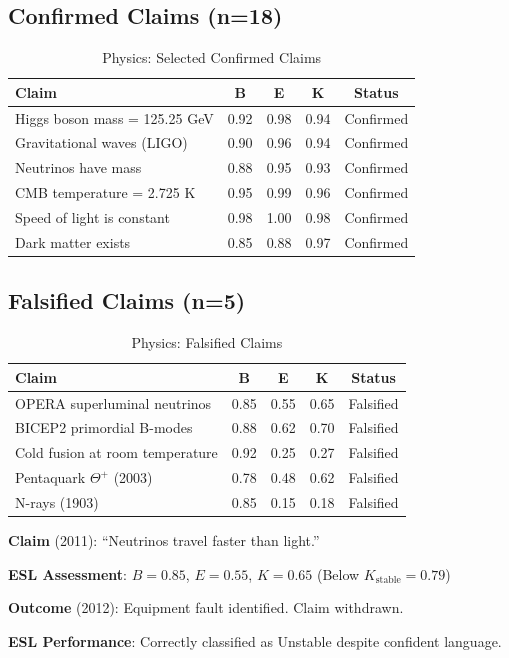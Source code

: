 \documentclass[11pt,a4paper]{article}
\theoremstyle{remark}
\begin{document}
\subsection{Confirmed Claims (n=18)}

\begin{table}[h]
\centering
\caption{Physics: Selected Confirmed Claims}
\begin{tabular}{p{5.5cm}cccc}
\toprule
\textbf{Claim} & \textbf{B} & \textbf{E} & \textbf{K} & \textbf{Status} \\
\midrule
Higgs boson mass = 125.25 GeV & 0.92 & 0.98 & 0.94 & Confirmed \\
Gravitational waves (LIGO) & 0.90 & 0.96 & 0.94 & Confirmed \\
Neutrinos have mass & 0.88 & 0.95 & 0.93 & Confirmed \\
CMB temperature = 2.725 K & 0.95 & 0.99 & 0.96 & Confirmed \\
Speed of light is constant & 0.98 & 1.00 & 0.98 & Confirmed \\
Dark matter exists & 0.85 & 0.88 & 0.97 & Confirmed \\
\bottomrule
\end{tabular}
\end{table}

\subsection{Falsified Claims (n=5)}

\begin{table}[h]
\centering
\caption{Physics: Falsified Claims}
\begin{tabular}{p{5.5cm}cccc}
\toprule
\textbf{Claim} & \textbf{B} & \textbf{E} & \textbf{K} & \textbf{Status} \\
\midrule
OPERA superluminal neutrinos & 0.85 & 0.55 & 0.65 & Falsified \\
BICEP2 primordial B-modes & 0.88 & 0.62 & 0.70 & Falsified \\
Cold fusion at room temperature & 0.92 & 0.25 & 0.27 & Falsified \\
Pentaquark $\Theta^+$ (2003) & 0.78 & 0.48 & 0.62 & Falsified \\
N-rays (1903) & 0.85 & 0.15 & 0.18 & Falsified \\
\bottomrule
\end{tabular}
\end{table}

\begin{examplebox}[title={OPERA Superluminal Neutrinos}]
\textbf{Claim} (2011): ``Neutrinos travel faster than light.''

\textbf{ESL Assessment}: $B = 0.85$, $E = 0.55$, $K = 0.65$ (Below $K_{\text{stable}} = 0.79$)

\textbf{Outcome} (2012): Equipment fault identified. Claim withdrawn.

\textbf{ESL Performance}: Correctly classified as Unstable despite confident language.
\end{examplebox}
\end{document}
